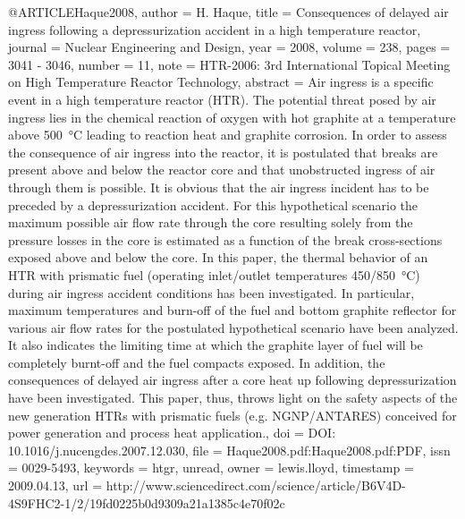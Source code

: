 {@ARTICLE{Haque2008,
  author = {H. Haque},
  title = {Consequences of delayed air ingress following a depressurization
	accident in a high temperature reactor},
  journal = {Nuclear Engineering and Design},
  year = {2008},
  volume = {238},
  pages = {3041 - 3046},
  number = {11},
  note = {HTR-2006: 3rd International Topical Meeting on High Temperature Reactor
	Technology},
  abstract = {Air ingress is a specific event in a high temperature reactor (HTR).
	The potential threat posed by air ingress lies in the chemical reaction
	of oxygen with hot graphite at a temperature above 500 °C leading
	to reaction heat and graphite corrosion. In order to assess the consequence
	of air ingress into the reactor, it is postulated that breaks are
	present above and below the reactor core and that unobstructed ingress
	of air through them is possible. It is obvious that the air ingress
	incident has to be preceded by a depressurization accident. For this
	hypothetical scenario the maximum possible air flow rate through
	the core resulting solely from the pressure losses in the core is
	estimated as a function of the break cross-sections exposed above
	and below the core. In this paper, the thermal behavior of an HTR
	with prismatic fuel (operating inlet/outlet temperatures 450/850 °C)
	during air ingress accident conditions has been investigated. In
	particular, maximum temperatures and burn-off of the fuel and bottom
	graphite reflector for various air flow rates for the postulated
	hypothetical scenario have been analyzed. It also indicates the limiting
	time at which the graphite layer of fuel will be completely burnt-off
	and the fuel compacts exposed. In addition, the consequences of delayed
	air ingress after a core heat up following depressurization have
	been investigated. This paper, thus, throws light on the safety aspects
	of the new generation HTRs with prismatic fuels (e.g. NGNP/ANTARES)
	conceived for power generation and process heat application.},
  doi = {DOI: 10.1016/j.nucengdes.2007.12.030},
  file = {Haque2008.pdf:Haque2008.pdf:PDF},
  issn = {0029-5493},
  keywords = {htgr, unread},
  owner = {lewis.lloyd},
  timestamp = {2009.04.13},
  url = {http://www.sciencedirect.com/science/article/B6V4D-4S9FHC2-1/2/19fd0225b0d9309a21a1385c4e70f02c}
}

}
